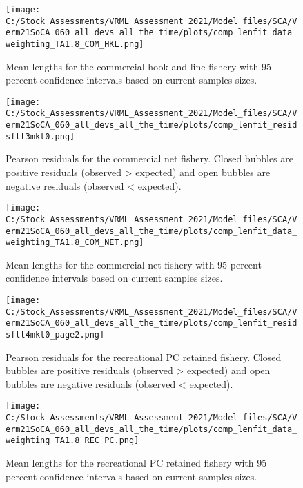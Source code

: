 \documentclass[11pt,
  english,
  a4paper,
]{article}
\begin{document}
\begin{figure}
\centering
\texttt{[image: C:/Stock\_Assessments/VRML\_Assessment\_2021/Model\_files/SCA/Verm21SoCA\_060\_all\_devs\_all\_the\_time/plots/comp\_lenfit\_data\_weighting\_TA1.8\_COM\_HKL.png]}
\caption{Mean lengths for the commercial hook-and-line fishery with 95 percent confidence intervals based on current samples sizes.\label{fig:mean-len-fit-COM-HKL}}
\end{figure}

\begin{figure}
\centering
\texttt{[image: C:/Stock\_Assessments/VRML\_Assessment\_2021/Model\_files/SCA/Verm21SoCA\_060\_all\_devs\_all\_the\_time/plots/comp\_lenfit\_residsflt3mkt0.png]}
\caption{Pearson residuals for the commercial net fishery. Closed bubbles are positive residuals (observed \textgreater{} expected) and open bubbles are negative residuals (observed \textless{} expected).\label{fig:len-pearson-COM-NET}}
\end{figure}

\begin{figure}
\centering
\texttt{[image: C:/Stock\_Assessments/VRML\_Assessment\_2021/Model\_files/SCA/Verm21SoCA\_060\_all\_devs\_all\_the\_time/plots/comp\_lenfit\_data\_weighting\_TA1.8\_COM\_NET.png]}
\caption{Mean lengths for the commercial net fishery with 95 percent confidence intervals based on current samples sizes.\label{fig:mean-len-fit-COM-NET}}
\end{figure}

\begin{figure}
\centering
\texttt{[image: C:/Stock\_Assessments/VRML\_Assessment\_2021/Model\_files/SCA/Verm21SoCA\_060\_all\_devs\_all\_the\_time/plots/comp\_lenfit\_residsflt4mkt0\_page2.png]}
\caption{Pearson residuals for the recreational PC retained fishery. Closed bubbles are positive residuals (observed \textgreater{} expected) and open bubbles are negative residuals (observed \textless{} expected).\label{fig:len-pearson-REC-PC}}
\end{figure}

\begin{figure}
\centering
\texttt{[image: C:/Stock\_Assessments/VRML\_Assessment\_2021/Model\_files/SCA/Verm21SoCA\_060\_all\_devs\_all\_the\_time/plots/comp\_lenfit\_data\_weighting\_TA1.8\_REC\_PC.png]}
\caption{Mean lengths for the recreational PC retained fishery with 95 percent confidence intervals based on current samples sizes.\label{fig:mean-len-fit-REC-PC}}
\end{figure}
\end{document}
